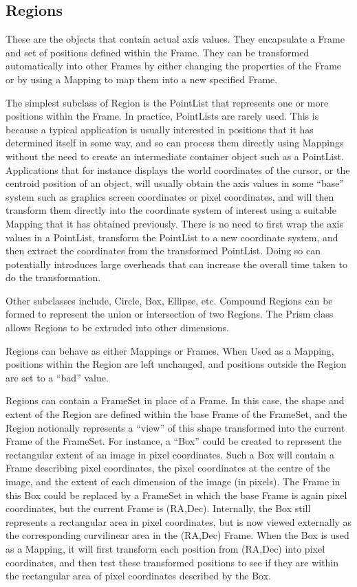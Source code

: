 \documentclass[final,authoryear,5p,times,twocolumn]{elsarticle}
\begin{document}
\subsection{Regions}

These are the objects that contain actual axis values. They
encapsulate a Frame and set of positions defined within the
Frame. They can be transformed automatically into other Frames by
either changing the properties of the Frame or by using a Mapping to
map them into a new specified Frame.

The simplest subclass of Region is the PointList that represents one
or more positions within the Frame.  In practice, PointLists are
rarely used. This is because a typical application is usually
interested in positions that it has determined itself in some way, and
so can process them directly using Mappings without the need to create
an intermediate container object such as a PointList. Applications
that for instance displays the world coordinates of the cursor, or the
centroid position of an object, will usually obtain the axis values in
some “base” system such as graphics screen coordinates or pixel
coordinates, and will then transform them directly into the coordinate
system of interest using a suitable Mapping that it has obtained
previously. There is no need to first wrap the axis values in a
PointList, transform the PointList to a new coordinate system, and
then extract the coordinates from the transformed PointList. Doing so
can potentially introduces large overheads that can increase the
overall time taken to do the transformation.

Other subclasses include, Circle, Box, Ellipse, etc. Compound Regions
can be formed to represent the union or intersection of two
Regions. The Prism class allows Regions to be extruded into other
dimensions.

Regions can behave as either Mappings or Frames. When Used as a
Mapping, positions within the Region are left unchanged, and positions
outside the Region are set to a “bad” value.

Regions can contain a FrameSet in place of a Frame. In this case, the
shape and extent of the Region are defined within the base Frame of
the FrameSet, and the Region notionally represents a “view” of this
shape transformed into the current Frame of the FrameSet. For
instance, a “Box” could be created to represent the rectangular extent
of an image in pixel coordinates. Such a Box will contain a Frame
describing pixel coordinates, the pixel coordinates at the centre of
the image, and the extent of each dimension of the image (in
pixels). The Frame in this Box could be replaced by a FrameSet in
which the base Frame is again pixel coordinates, but the current Frame
is (RA,Dec). Internally, the Box still represents a rectangular area
in pixel coordinates, but is now viewed externally as the
corresponding curvilinear area in the (RA,Dec) Frame. When the Box is
used as a Mapping, it will first transform each position from (RA,Dec)
into pixel coordinates, and then test these transformed positions to
see if they are within the rectangular area of pixel coordinates
described by the Box.
\end{document}
